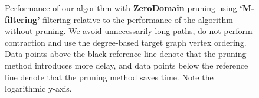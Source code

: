 \begin{figure}
\begin{subfigure} {0.5\linewidth}

\end{subfigure}

\caption{Performance of our algorithm with \textbf{ZeroDomain} pruning using \textbf{`M-filtering'} filtering relative to the performance of the algorithm without pruning. We avoid unnecessarily long paths, do not perform contraction and use the degree-based target graph vertex ordering. Data points above the black reference line denote that the pruning method introduces more delay, and data points below the reference line denote that the pruning method saves time. Note the logarithmic y-axis.}	
\label{fig:test}
\end{figure}

